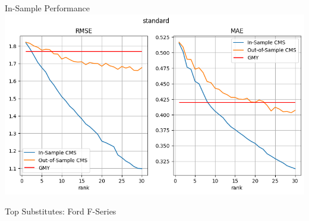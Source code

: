 \documentclass[aspectratio=169,10pt]{beamer}
\begin{document}
\begin{frame}{In-Sample Performance}
\label{in_sample}
\centering
\includegraphics[height=\textheight,width=\textwidth, keepaspectratio]{resources/standard_lambda_tuned.png}\\
\end{frame}




 \begin{frame}{Top Substitutes: Ford F-Series}
    \centering
    \\
 \end{frame}
\end{document}
